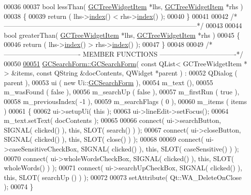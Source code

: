 \begin{DoxyCode}
00036 
00037 \textcolor{keywordtype}{bool} lessThan( \hyperlink{class_g_c_tree_widget_item}{GCTreeWidgetItem} *lhs, \hyperlink{class_g_c_tree_widget_item}{GCTreeWidgetItem} *rhs )
00038 \{
00039   \textcolor{keywordflow}{return} ( lhs->\hyperlink{class_g_c_tree_widget_item_af6b48ae274cc4989811ef44944c8ad76}{index}() < rhs->\hyperlink{class_g_c_tree_widget_item_af6b48ae274cc4989811ef44944c8ad76}{index}() );
00040 \}
00041 
00042 \textcolor{comment}{/*
      --------------------------------------------------------------------------------------*/}
00043 
00044 \textcolor{keywordtype}{bool} greaterThan( \hyperlink{class_g_c_tree_widget_item}{GCTreeWidgetItem} *lhs, \hyperlink{class_g_c_tree_widget_item}{GCTreeWidgetItem} *rhs )
00045 \{
00046   \textcolor{keywordflow}{return} ( lhs->\hyperlink{class_g_c_tree_widget_item_af6b48ae274cc4989811ef44944c8ad76}{index}() > rhs->\hyperlink{class_g_c_tree_widget_item_af6b48ae274cc4989811ef44944c8ad76}{index}() );
00047 \}
00048 
00049 \textcolor{comment}{/*---------------------------------- MEMBER FUNCTIONS
       ----------------------------------*/}
00050 
\hypertarget{gcsearchform_8cpp_source_l00051}{}\hyperlink{class_g_c_search_form_a3e8731704cbe2cc86957af8aa6d7c17a}{00051} \hyperlink{class_g_c_search_form_a3e8731704cbe2cc86957af8aa6d7c17a}{GCSearchForm::GCSearchForm}( \textcolor{keyword}{const} QList< GCTreeWidgetItem * > &items, \textcolor{keyword}{const} 
      QString &docContents, QWidget *parent ) :
00052   QDialog        ( parent ),
00053   ui             ( new Ui::\hyperlink{class_g_c_search_form}{GCSearchForm} ),
00054   m\_text         (),
00055   m\_wasFound     ( false ),
00056   m\_searchUp     ( false ),
00057   m\_firstRun     ( true ),
00058   m\_previousIndex( -1 ),
00059   m\_searchFlags  ( 0 ),
00060   m\_items        ( items )
00061 \{
00062   ui->setupUi( \textcolor{keyword}{this} );
00063   ui->lineEdit->setFocus();
00064   m\_text.setText( docContents );
00065 
00066   connect( ui->searchButton, SIGNAL( clicked() ), \textcolor{keyword}{this}, SLOT( search() ) );
00067   connect( ui->closeButton,  SIGNAL( clicked() ), \textcolor{keyword}{this}, SLOT( close() ) );
00068 
00069   connect( ui->caseSensitiveCheckBox, SIGNAL( clicked() ), \textcolor{keyword}{this}, SLOT( 
      caseSensitive() ) );
00070   connect( ui->wholeWordsCheckBox,    SIGNAL( clicked() ), \textcolor{keyword}{this}, SLOT( 
      wholeWords() ) );
00071   connect( ui->searchUpCheckBox,      SIGNAL( clicked() ), \textcolor{keyword}{this}, SLOT( searchUp
      () ) );
00072 
00073   setAttribute( Qt::WA\_DeleteOnClose );
00074 \}

\end{DoxyCode}
